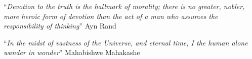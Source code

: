 \documentclass[
openright,
12pt, %
english,%
onehalfspacing, %
nolistspacing, %
nohyperref, %
headsepline, %
]{MastersDoctoralThesis} %
\begin{document}
    
    



\vspace*{0.2\textheight}

\noindent\enquote{\itshape Devotion to the truth is the hallmark of morality; there is no greater, nobler, more heroic form of devotion than the act of a man who assumes the responsibility of thinking}\bigbreak
\hfill Ayn Rand

\noindent\enquote{\itshape In the midst of vastness of the Universe, and eternal time, I the human alone wander in wonder}\bigbreak
\hfill Mahabishwe Mahakashe
\end{document}
